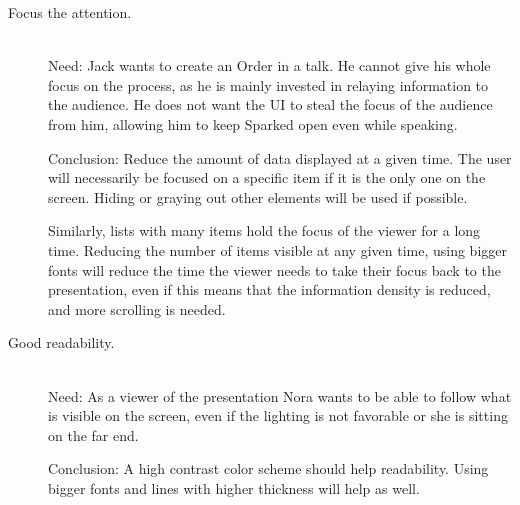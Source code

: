 \begin{description}
\item [Focus the attention.]\hfill \\
Need: Jack wants to create an Order in a talk. He cannot  give his whole focus on the process, as he is mainly invested in relaying information to the audience. He does not want the UI to steal the focus of the audience from him, allowing him to keep Sparked open even while speaking.

Conclusion: Reduce the amount of data displayed at a given time. The user will necessarily be focused on a specific item if it is the only one on the screen. Hiding or graying out other elements will be used if possible.

Similarly, lists with many items hold the focus of the viewer for a long time. Reducing the number of items visible at any given time, using bigger fonts will reduce the time the viewer needs to take their focus back to the presentation, even if this means that the information density is reduced, and more scrolling is needed. 

\item [Good readability.]\hfill \\
Need: As a viewer of the presentation Nora wants to be able to follow what is visible on the screen, even if the lighting is not favorable or she is sitting on the far end. 

Conclusion: A high contrast color scheme should help readability. Using bigger fonts and lines with higher thickness will help as well. 
\end{description}

